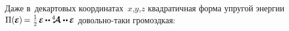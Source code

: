 \begin{otherlanguage}{russian}

\vspace{.1em}
Даже в~декартовых координатах~$x$,\:$y$,\:$z$ квадратичная форма упругой энергии ${\potential(\hspace{-0.1ex}\infinitesimaldeformation\hspace{-0.1ex}) \hspace{-0.2ex}=\hspace{.1ex} \smallerdisplaystyleonehalf \hspace{.25ex} \infinitesimaldeformation \hspace{-0.1ex} \dotdotp \hspace{-0.1ex} \stiffnesstensor \dotdotp \hspace{-0.1ex} \infinitesimaldeformation}$ довольно\hbox{-}таки громоздкая:


\end{otherlanguage}
